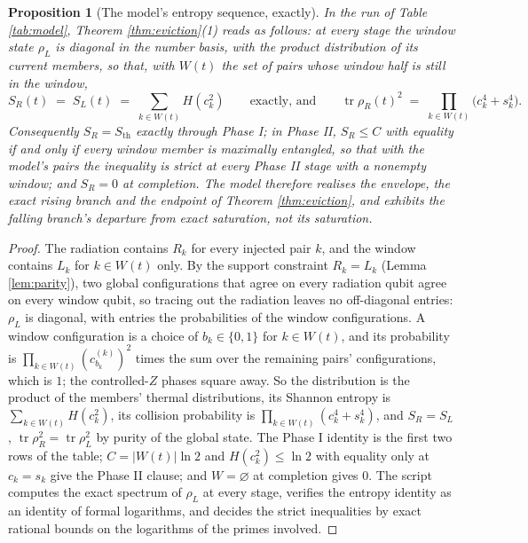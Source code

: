 \documentclass[11pt]{article}
\newtheorem{proposition}[theorem]{Proposition}
\theoremstyle{definition}
\newcommand{\Sth}{S_{\mathrm{th}}}
\newcommand{\tr}{\operatorname{tr}}
\begin{document}
\begin{proposition}[The model's entropy sequence, exactly]\label{prop:modelentropy}
In the run of Table \ref{tab:model}, Theorem \ref{thm:eviction}(1) reads as follows: at every stage the window state $\rho_L$ is diagonal in the number basis, with the product distribution of its current members, so that, with $W(t)$ the set of pairs whose window half is still in the window,
\[
S_R(t) \;=\; S_L(t) \;=\; \sum_{k \in W(t)} H(c_k^{2}) \qquad \text{exactly, and} \qquad \tr\rho_R(t)^{2} \;=\; \prod_{k \in W(t)}\bigl(c_k^{4} + s_k^{4}\bigr) .
\]
Consequently $S_R = \Sth$ exactly through Phase I; in Phase II, $S_R \leq C$ with equality if and only if every window member is maximally entangled, so that with the model's pairs the inequality is strict at every Phase II stage with a nonempty window; and $S_R = 0$ at completion. The model therefore realises the envelope, the exact rising branch and the endpoint of Theorem \ref{thm:eviction}, and exhibits the falling branch's departure from exact saturation, not its saturation.
\end{proposition}

\begin{proof}
The radiation contains $R_k$ for every injected pair $k$, and the window contains $L_k$ for $k \in W(t)$ only. By the support constraint $R_k = L_k$ (Lemma \ref{lem:parity}), two global configurations that agree on every radiation qubit agree on every window qubit, so tracing out the radiation leaves no off-diagonal entries: $\rho_L$ is diagonal, with entries the probabilities of the window configurations. A window configuration is a choice of $b_k \in \{0, 1\}$ for $k \in W(t)$, and its probability is $\prod_{k \in W(t)}(c^{(k)}_{b_k})^{2}$ times the sum over the remaining pairs' configurations, which is $1$; the controlled-$Z$ phases square away. So the distribution is the product of the members' thermal distributions, its Shannon entropy is $\sum_{k \in W(t)}H(c_k^{2})$, its collision probability is $\prod_{k \in W(t)}(c_k^{4} + s_k^{4})$, and $S_R = S_L$, $\tr\rho_R^{2} = \tr\rho_L^{2}$ by purity of the global state. The Phase I identity is the first two rows of the table; $C = |W(t)|\ln 2$ and $H(c_k^{2}) \leq \ln 2$ with equality only at $c_k = s_k$ give the Phase II clause; and $W = \varnothing$ at completion gives $0$. The script computes the exact spectrum of $\rho_L$ at every stage, verifies the entropy identity as an identity of formal logarithms, and decides the strict inequalities by exact rational bounds on the logarithms of the primes involved.
\end{proof}
\end{document}
